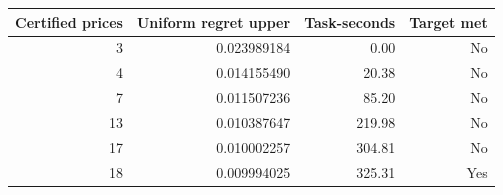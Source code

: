 \begin{tabular}{rrrr}\toprule
Certified prices & Uniform regret upper & Task-seconds & Target met \\ \midrule
3 & 0.023989184 & 0.00 & No \\
4 & 0.014155490 & 20.38 & No \\
7 & 0.011507236 & 85.20 & No \\
13 & 0.010387647 & 219.98 & No \\
17 & 0.010002257 & 304.81 & No \\
18 & 0.009994025 & 325.31 & Yes \\
\bottomrule\end{tabular}
